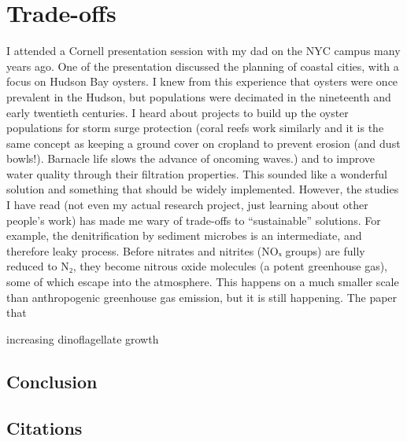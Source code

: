 \documentclass[
  11pt,
]{article}
\begin{document}
\section{Trade-offs}\label{trade-offs}

I attended a Cornell presentation session with my dad on the NYC campus
many years ago. One of the presentation discussed the planning of
coastal cities, with a focus on Hudson Bay oysters. I knew from this
experience that oysters were once prevalent in the Hudson, but
populations were decimated in the nineteenth and early twentieth
centuries. I heard about projects to build up the oyster populations for
storm surge protection (coral reefs work similarly and it is the same
concept as keeping a ground cover on cropland to prevent erosion (and
dust bowls!). Barnacle life slows the advance of oncoming waves.) and to
improve water quality through their filtration properties. This sounded
like a wonderful solution and something that should be widely
implemented. However, the studies I have read (not even my actual
research project, just learning about other people's work) has made me
wary of trade-offs to ``sustainable'' solutions. For example, the
denitrification by sediment microbes is an intermediate, and therefore
leaky process. Before nitrates and nitrites (NOₓ groups) are fully
reduced to N₂, they become nitrous oxide molecules (a potent greenhouse
gas), some of which escape into the atmosphere. This happens on a much
smaller scale than anthropogenic greenhouse gas emission, but it is
still happening. The paper that~

increasing dinoflagellate growth

\subsection{Conclusion}\label{conclusion}

\subsection*{Citations}\label{citations}
\end{document}
